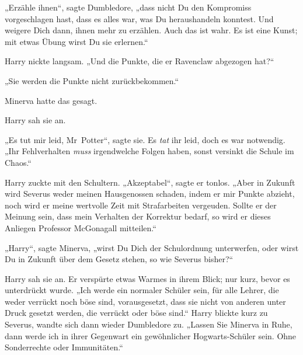 „Erzähle ihnen“, sagte Dumbledore, „dass nicht Du den Kompromiss vorgeschlagen hast, dass es alles war, was Du heraushandeln konntest. Und weigere Dich dann, ihnen mehr zu erzählen. Auch das ist wahr. Es ist eine Kunst; mit etwas Übung wirst Du sie erlernen.“

Harry nickte langsam. „Und die Punkte, die er Ravenclaw abgezogen hat?“

„Sie werden die Punkte nicht zurückbekommen.“

Minerva hatte das gesagt.

Harry sah sie an.

„Es tut mir leid, Mr~Potter“, sagte sie. Es \emph{tat} ihr leid, doch es war notwendig. „Ihr Fehlverhalten \emph{muss} irgendwelche Folgen haben, sonst versinkt die Schule im Chaos.“

Harry zuckte mit den Schultern. „Akzeptabel“, sagte er tonlos. „Aber in Zukunft wird Severus weder meinen Hausgenossen schaden, indem er mir Punkte abzieht, noch wird er meine wertvolle Zeit mit Strafarbeiten vergeuden. Sollte er der Meinung sein, dass mein Verhalten der Korrektur bedarf, so wird er dieses Anliegen Professor McGonagall mitteilen.“

„Harry“, sagte Minerva, „wirst Du Dich der Schulordnung unterwerfen, oder wirst Du in Zukunft über dem Gesetz stehen, so wie Severus bisher?“

Harry sah sie an. Er verspürte etwas Warmes in ihrem Blick; nur kurz, bevor es unterdrückt wurde. „Ich werde ein normaler Schüler sein, für alle Lehrer, die weder verrückt noch böse sind, vorausgesetzt, dass sie nicht von anderen unter Druck gesetzt werden, die verrückt oder böse sind.“ Harry blickte kurz zu Severus, wandte sich dann wieder Dumbledore zu. „Lassen Sie Minerva in Ruhe, dann werde ich in ihrer Gegenwart ein gewöhnlicher Hogwarts-Schüler sein. Ohne Sonderrechte oder Immunitäten.“

